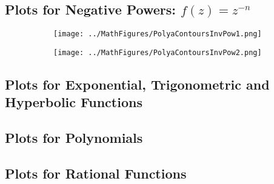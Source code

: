 \documentclass[12pt]{article}
\begin{document}




\subsection{Plots for Negative Powers: $f(z) = z^{-n}$}

\begin{figure}[h]
\caption{Polya potential contours of $f(z) = 1/z$ and $f(z) = 1/z^2$}	
\label{Fig:ContoursInvPow_1_2}	
\centering
\begin{subfigure}[b]{0.49\textwidth}
\centering
\texttt{[image: ../MathFigures/PolyaContoursInvPow1.png]}
\end{subfigure}
\begin{subfigure}[b]{0.49\textwidth}
\centering
\texttt{[image: ../MathFigures/PolyaContoursInvPow2.png]}
\end{subfigure}
\end{figure}


\subsection{Plots for Exponential, Trigonometric and Hyperbolic Functions}

\subsection{Plots for Polynomials}

\subsection{Plots for Rational Functions}


\end{document}
